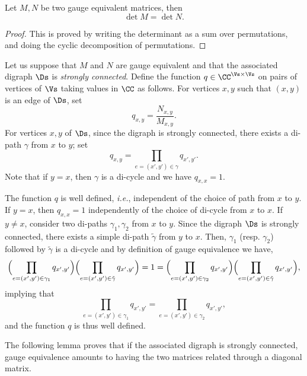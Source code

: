 \documentclass[a4paper,twoside,11pt]{article}
\begin{document}
\begin{lem}\label{lem:gauge_det_1}
Let $M,N$ be two gauge equivalent matrices, then
\[
\det M=\det N.
\]
\end{lem}
\begin{proof}
This is proved by writing the determinant as a sum over permutations, and doing the cyclic decomposition of permutations. 
\end{proof}

Let us suppose that $M$ and $N$ are gauge equivalent and that the associated digraph $\Ds$ is \emph{strongly connected}.
Define the function $q\in \CC^{\Vs\times \Vs}$ on pairs of vertices of $\Vs$ taking values in $\CC$ as follows. 
For vertices $x,y$ such that $(x,y)$ is an edge of $\Ds$, set 
\[
q_{x,y}=\frac{N_{x,y}}{M_{x,y}}.
\]
For vertices $x,y$ of $\Ds$, since the digraph is strongly connected, there exists a di-path
$\gamma$ from $x$ to $y$; set
\[
q_{x,y}=\prod_{e=(x',y')\in\gamma}q_{x',y'}.
\]
Note that if $y=x$, then $\gamma$ is a di-cycle and we have $q_{x,x}=1$.
\begin{rem}
The function $q$ is well defined, \emph{i.e.}, independent of the choice of path from $x$ to $y$. If $y=x$, then $q_{x,x}=1$ 
independently of the choice of di-cycle from $x$ to $x$. If $y\neq x$,
consider two di-paths $\gamma_1,\gamma_2$ from $x$ to $y$. Since the digraph $\Ds$ is strongly connected, there exists a simple 
di-path $\tilde{\gamma}$ from $y$ to $x$. Then, $\gamma_1$  (resp. $\gamma_2$) followed by $\tilde{\gamma}$ is a di-cycle and by 
definition of gauge equivalence we have,
\[
\Bigl(\prod_{e=(x',y')\in\gamma_1}q_{x',y'}\Bigr)\Bigl(\prod_{e=(x',y')\in\tilde{\gamma}}q_{x',y'}\Bigr)=1=
\Bigl(\prod_{e=(x',y')\in\gamma_2}q_{x',y'}\Bigr)\Bigl(\prod_{e=(x',y')\in\tilde{\gamma}}q_{x',y'}\Bigr),
\]
implying that
\[
\prod_{e=(x',y')\in\gamma_1}q_{x',y'}=\prod_{e=(x',y')\in\gamma_2}q_{x',y'},
\]
and the function $q$ is thus well defined.
\end{rem}

The following lemma proves that if the associated digraph is strongly connected, gauge equivalence amounts to having the two 
matrices related through a diagonal matrix.
\end{document}
